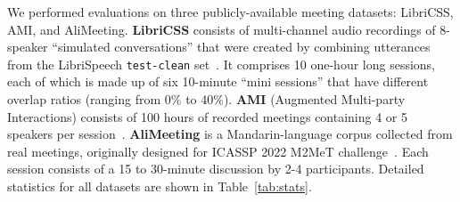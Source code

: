 \documentclass[a4paper]{article}
\begin{document}
\begin{table}[b]
\centering
\caption{Statistics of datasets used for evaluations. LibriCSS does not have a train set. The -speaker durations are in terms of fraction of total speaking time.}
\label{tab:stats}
\end{table}

We performed evaluations on three publicly-available meeting datasets: LibriCSS, AMI, and AliMeeting. \textbf{LibriCSS} consists of multi-channel audio recordings of 8-speaker ``simulated conversations'' that were created by combining utterances from the LibriSpeech \texttt{test-clean} set~\cite{Panayotov2015LibrispeechAA}. It comprises 10 one-hour long sessions, each of which is made up of six 10-minute ``mini sessions'' that have different overlap ratios (ranging from 0\% to 40\%). \textbf{AMI} (Augmented Multi-party Interactions) consists of 100 hours of recorded meetings containing 4 or 5 speakers per session~\cite{Carletta2005TheAM}. \textbf{AliMeeting} is a Mandarin-language corpus collected from real meetings, originally designed for ICASSP 2022 M2MeT challenge~\cite{Yu2022M2MetTI}. Each session consists of a 15 to 30-minute
discussion by 2-4 participants. Detailed statistics for all datasets are shown in Table~\ref{tab:stats}.
\end{document}
